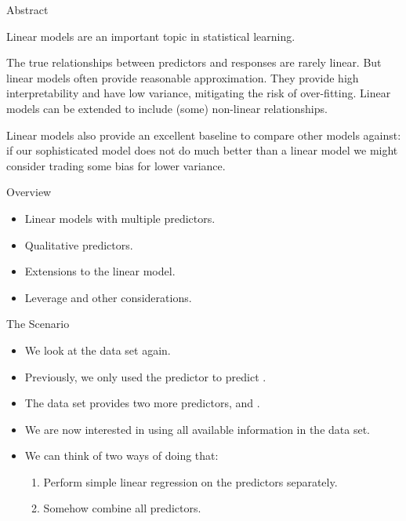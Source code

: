 \documentclass[mathserif, aspectratio=169]{beamer}
\subtitle{\bfseries%
  {Linear Regression, Part 2}\\%
  {\tiny\it multiple linear regression, qualitative predictors, interaction \& non-linear terms, leverage and other considerations}\\%
}
\begin{document}


\begin{frame}{Abstract}

	\begin{blurb}
		Linear models are an important topic in statistical learning.  

		The true relationships between predictors and responses are rarely linear.
		But linear models often provide reasonable approximation. They provide
		high interpretability and have low variance, mitigating the risk of over-fitting.
		Linear models can be extended to include (some) non-linear relationships. 

		Linear models also provide an excellent baseline to compare other models against: if 
		our sophisticated model does not do much better than a linear model we might consider
		trading some bias for lower variance.
	\end{blurb}
\end{frame}

\begin{frame}{Overview}
	\begin{itemize}
		\item Linear models with multiple predictors.
		\item Qualitative predictors.
		\item Extensions to the linear model.
		\item Leverage and other considerations.
	\end{itemize}
\end{frame}

\begin{frame}{The Scenario}
	\begin{itemize}
		\item We look at the  data set again.
		\item Previously, we only used the  predictor to predict .
		\item The data set provides two more predictors,  and .
		\item We are now interested in using all available information in the data set.
		\item We can think of two ways of doing that:
			\begin{cpage}
				\begin{enumerate}
					\item Perform simple linear regression on the predictors separately.
					\item Somehow combine all predictors.
				\end{enumerate}
			\end{cpage}
	\end{itemize}
\end{frame}
\end{document}
